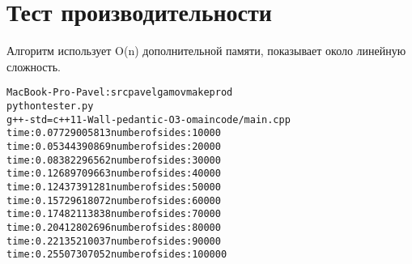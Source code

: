 \section{Тест производительности}

Алгоритм использует O(n) дополнительной памяти, показывает около линейную сложность.

\begin{alltt}
MacBook-Pro-Pavel:src pavelgamov make prod
python tester.py
g++ -std=c++11 -Wall -pedantic -O3 -o main code/main.cpp
time : 0.07729005813 number of sides : 10000
time : 0.05344390869 number of sides : 20000
time : 0.08382296562 number of sides : 30000
time : 0.12689709663 number of sides : 40000
time : 0.12437391281 number of sides : 50000
time : 0.15729618072 number of sides : 60000
time : 0.17482113838 number of sides : 70000
time : 0.20412802696 number of sides : 80000
time : 0.22135210037 number of sides : 90000
time : 0.25507307052 number of sides : 100000
\end{alltt}

\pagebreak
